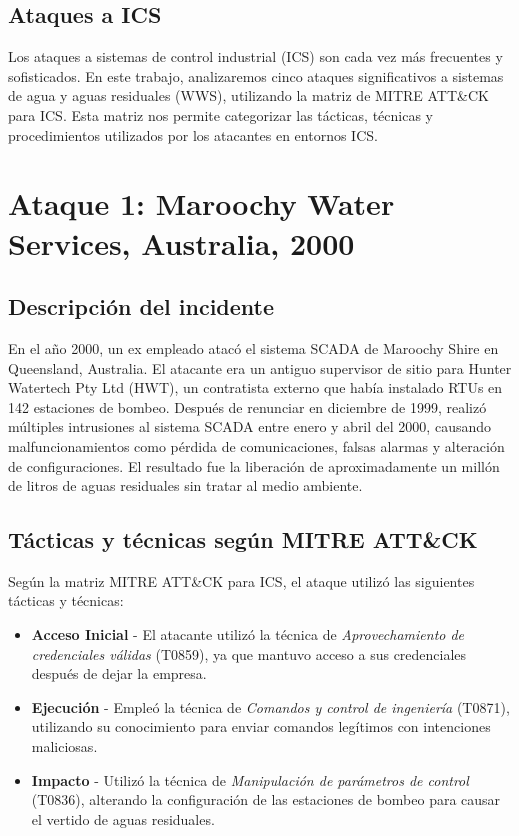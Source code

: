 \subsection{Ataques a ICS}
Los ataques a sistemas de control industrial (ICS) son cada vez más frecuentes y sofisticados. En este trabajo, analizaremos cinco ataques significativos a sistemas de agua y aguas residuales (WWS), utilizando la matriz de MITRE ATT\&CK para ICS. Esta matriz nos permite categorizar las tácticas, técnicas y procedimientos utilizados por los atacantes en entornos ICS.

\section{Ataque 1: Maroochy Water Services, Australia, 2000}

\subsection{Descripción del incidente}
En el año 2000, un ex empleado atacó el sistema SCADA de Maroochy Shire en Queensland, Australia. El atacante era un antiguo supervisor de sitio para Hunter Watertech Pty Ltd (HWT), un contratista externo que había instalado RTUs en 142 estaciones de bombeo. Después de renunciar en diciembre de 1999, realizó múltiples intrusiones al sistema SCADA entre enero y abril del 2000, causando malfuncionamientos como pérdida de comunicaciones, falsas alarmas y alteración de configuraciones. El resultado fue la liberación de aproximadamente un millón de litros de aguas residuales sin tratar al medio ambiente.

\subsection{Tácticas y técnicas según MITRE ATT\&CK}
Según la matriz MITRE ATT\&CK para ICS, el ataque utilizó las siguientes tácticas y técnicas:

\begin{itemize}
    \item \textbf{Acceso Inicial} - El atacante utilizó la técnica de \textit{Aprovechamiento de credenciales válidas} (T0859), ya que mantuvo acceso a sus credenciales después de dejar la empresa.
    
    \item \textbf{Ejecución} - Empleó la técnica de \textit{Comandos y control de ingeniería} (T0871), utilizando su conocimiento para enviar comandos legítimos con intenciones maliciosas.
    
    \item \textbf{Impacto} - Utilizó la técnica de \textit{Manipulación de parámetros de control} (T0836), alterando la configuración de las estaciones de bombeo para causar el vertido de aguas residuales.
\end{itemize}

